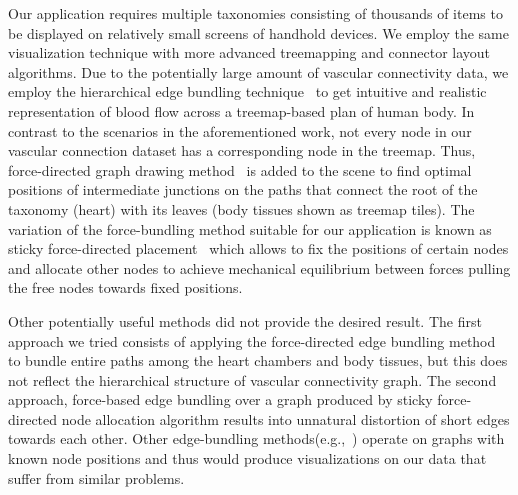 Our application requires multiple taxonomies consisting of thousands of items to be displayed on relatively small screens of handhold devices. We employ the same visualization technique with more advanced treemapping and connector layout algorithms. Due to the potentially large amount of vascular connectivity data, we employ the hierarchical edge bundling technique~\cite{Hol06} to get intuitive and realistic representation of blood flow across a treemap-based plan of human body. In contrast to the scenarios in the aforementioned work, not every node in our vascular connection dataset has a corresponding node in the treemap. Thus, force-directed graph drawing method~\cite{BET+99} is added to the scene to find optimal positions of intermediate junctions on the paths that connect the root of the taxonomy (heart) with its leaves (body tissues shown as treemap tiles). The variation of the force-bundling method suitable for our application is known as sticky force-directed placement~\cite{FR91} which allows to fix the positions of certain nodes and allocate other nodes to achieve mechanical equilibrium between forces pulling the free nodes towards fixed positions.

Other potentially useful methods did not provide the desired result. The first approach we tried consists of applying the
force-directed edge bundling method~\cite{HW09} to bundle entire paths among the heart chambers and body tissues, but this does not reflect the hierarchical structure of vascular connectivity graph. The second approach, force-based edge bundling over a graph produced by sticky force-directed node allocation algorithm results into unnatural distortion of short edges towards each other. Other edge-bundling methods(e.g.,~\cite{GHN+11,HET12,SHH11}) operate on graphs with known node positions and thus would produce visualizations on our data that suffer from similar problems.

